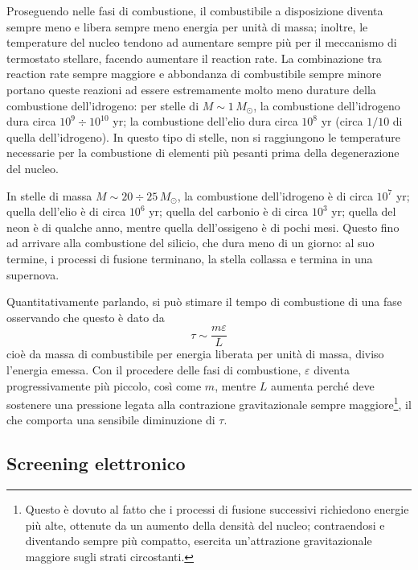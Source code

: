 \documentclass[11pt, a4paper]{scrartcl}
\theoremstyle{style}
\theoremstyle{style1}
\numberwithin{equation}{subsection}
\begin{document}
Proseguendo nelle fasi di combustione, il combustibile a disposizione diventa sempre meno e libera sempre meno energia per unit\`a di massa; inoltre, le temperature del nucleo tendono ad aumentare sempre pi\`u per il meccanismo di termostato stellare, facendo aumentare il reaction rate.
La combinazione tra reaction rate sempre maggiore e abbondanza di combustibile sempre minore portano queste reazioni ad essere estremamente molto meno durature della combustione dell'idrogeno: per stelle di $M\sim 1\, M_\odot $, la combustione dell'idrogeno dura circa $10^{9} \div 10^{10}$ yr; la combustione dell'elio dura circa $10^{8} $ yr (circa $1 / 10$ di quella dell'idrogeno).
In questo tipo di stelle, non si raggiungono le temperature necessarie per la combustione di elementi pi\`u pesanti prima della degenerazione del nucleo.

In stelle di massa $M \sim 20\div 25 \, M_\odot $, la combustione dell'idrogeno \`e di circa $10^7$ yr; quella dell'elio \`e di circa $10^6$ yr; quella del carbonio \`e di circa $10^3$ yr; quella del neon \`e di qualche anno, mentre quella dell'ossigeno \`e di pochi mesi.
Questo fino ad arrivare alla combustione del silicio, che dura meno di un giorno: al suo termine, i processi di fusione terminano, la stella collassa e termina in una supernova.

Quantitativamente parlando, si pu\`o stimare il tempo di combustione di una fase osservando che questo \`e dato da 
\[
\tau \sim \frac{m \varepsilon }{L}
\] 
cio\`e da massa di combustibile per energia liberata per unit\`a di massa, diviso l'energia emessa.
Con il procedere delle fasi di combustione, $\varepsilon $ diventa progressivamente pi\`u piccolo, cos\`i come $m$, mentre $L$ aumenta perch\'e deve sostenere una pressione legata alla contrazione gravitazionale sempre maggiore\footnote{Questo \`e dovuto al fatto che i processi di fusione successivi richiedono energie pi\`u alte, ottenute da un aumento della densit\`a del nucleo; contraendosi e diventando sempre pi\`u compatto, esercita un'attrazione gravitazionale maggiore sugli strati circostanti.}, il che comporta una sensibile diminuzione di $\tau $.
\subsection{Screening elettronico}
\end{document}
